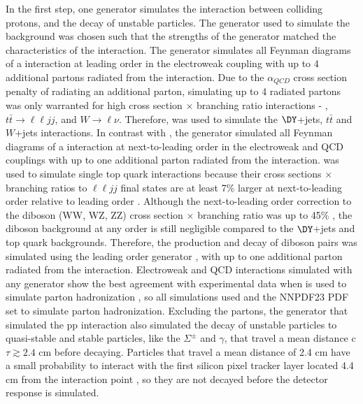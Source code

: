 In the first step, one \MC generator simulates the interaction between colliding protons, and the decay of unstable particles.  
The \MC generator used to simulate the background was chosen such that the strengths of the generator matched the characteristics of the 
interaction.  The \MADGRAPH generator \cite{madgraph} simulates all Feynman diagrams of a interaction at leading order in the electroweak 
coupling with up to 4 additional partons radiated from the interaction.  Due to the $\alpha_{QCD}$ cross section penalty of radiating an 
additional parton, simulating up to 4 radiated partons was only warranted for high cross section $\times$ branching ratio interactions - \DY, 
$t\bar{t} \rightarrow \ell\ell jj$, and $W \rightarrow \ell\nu$.  Therefore, \MADGRAPH was used to simulate the $\DY$+jets, $t\bar{t}$ 
and $W$+jets interactions.  In contrast with \MADGRAPH, the \POWHEG generator \cite{powheg} simulated all Feynman diagrams of a 
interaction at next-to-leading order in the electroweak and QCD couplings with up to one additional parton radiated from the interaction.  
\POWHEG was used to simulate single top quark interactions because their cross sections $\times$ branching ratios to $\ell\ell jj$ 
final states are at least 7\% larger at next-to-leading order relative to leading order \cite{singleTopNLOvsLO}.  
Although the next-to-leading order correction to the diboson (WW, WZ, ZZ) cross section $\times$ branching ratio was up to 45\% 
\cite{dibosonLOvsNLO}, the diboson background at any order is still negligible compared to the $\DY$+jets and top quark backgrounds.  Therefore, 
the production and decay of diboson pairs was simulated using the leading order \PYTHIA generator \cite{pythia8,Sjostrand:2006za}, 
with up to one additional parton radiated from the interaction.  Electroweak and QCD interactions simulated with any \MC generator show 
the best agreement with experimental data when \PYTHIA is used to simulate parton hadronization \cite{pythiaForHadronization}, so all 
simulations used \PYTHIA and the NNPDF23 PDF set \cite{nnpdf} to simulate parton hadronization.  Excluding the partons, the \MC generator 
that simulated the pp interaction also simulated the decay of unstable particles to quasi-stable and stable particles, like the $\Sigma^{\pm}$ 
and $\gamma$, that travel a mean distance c$\tau \gtrsim 2.4$ cm before decaying.  Particles that travel a mean distance of 2.4 cm have a 
small probability to interact with the first silicon pixel tracker layer located 4.4 cm from the interaction point \cite{cmsTdrPhysPerformance}, 
so they are not decayed before the detector response is simulated.

